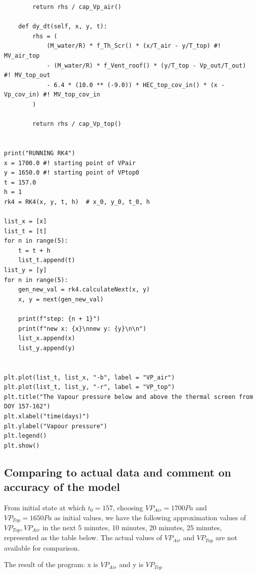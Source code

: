 \documentclass[a4paper]{article}
\numberwithin{equation}{section}
\begin{document}
\begin{mdframed}[leftline=false,rightline=false,backgroundcolor=cyan!10,nobreak=false]
\begin{verbatim}
        return rhs / cap_Vp_air()

    def dy_dt(self, x, y, t):
        rhs = (
            (M_water/R) * f_Th_Scr() * (x/T_air - y/T_top) #! MV_air_top
            - (M_water/R) * f_Vent_roof() * (y/T_top - Vp_out/T_out) #! MV_top_out
            - 6.4 * (10.0 ** (-9.0)) * HEC_top_cov_in() * (x - Vp_cov_in) #! MV_top_cov_in
        )

        return rhs / cap_Vp_top()


print("RUNNING RK4")
x = 1700.0 #! starting point of VPair
y = 1650.0 #! starting point of VPtop0
t = 157.0
h = 1
rk4 = RK4(x, y, t, h)  # x_0, y_0, t_0, h

list_x = [x]
list_t = [t]
for n in range(5):
    t = t + h
    list_t.append(t)
list_y = [y]
for n in range(5):
    gen_new_val = rk4.calculateNext(x, y)
    x, y = next(gen_new_val)

    print(f"step: {n + 1}")
    print(f"new x: {x}\nnew y: {y}\n\n")
    list_x.append(x)
    list_y.append(y)


plt.plot(list_t, list_x, "-b", label = "VP_air")
plt.plot(list_t, list_y, "-r", label = "VP_top")
plt.title("The Vapour pressure below and above the thermal screen from DOY 157-162")
plt.xlabel("time(days)")
plt.ylabel("Vapour pressure")
plt.legend()
plt.show()
  \end{verbatim}
\end{mdframed}

\newpage

\subsection{Comparing to actual data and comment on accuracy of the model}
From initial state at which \(t_{0} = 157\), choosing \(VP_{Air} = 1700 Pa\) and \(VP_{Top} = 1650 Pa\) as initial values, we have the following approximation values of \(VP_{Top}, VP_{Air}\) in the next 5 minutes, 10 minutes, 20 minutes, 25 minutes, represented as the table below. The actual values of \(VP_{Air}\) and \(VP_{Top}\) are not available for comparison.

The result of the program: x is $VP_{Air}$ and y is $VP_{Top}$
\end{document}
